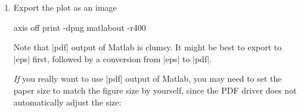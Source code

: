 {{\begin{enumerate}
\begin{codeexample}
h = datacursormode(gcf);
set(h,'UpdateFcn',@myupdatefcn,'SnapToDataVertex','off');
datacursormode on


function [txt] = myupdatefcn(obj,event_obj)

dpi = get(0,'ScreenPixelsPerInch');

screen_location=get(0,'PointerLocation');

figurePos = get(gcf,'Position');

pos = get(event_obj,'Position');

display(['(',num2str(pos(1)),',',num2str(pos(2)),',',num2str(pos(3)),') => (', ...
   num2str((screen_location(1)-figurePos(1))*72.27/dpi),',', ...
   num2str((screen_location(2)-figurePos(2))*72.27/dpi),')'])

txt = {['X: ',num2str(pos(1))],['Y: ',num2str(pos(2))],['Z: ',num2str(pos(3))]};
\end{codeexample}
	
	Run |pgfplotscsconversion|, click on four points in your plot. Preferably select non-colinear points near the edges of the plot. Copy and paste the four lines that were written to the Matlab command window.

	Make sure that the first two points have different $X$ and $Y$ values on screen (i.e.\ image canvas coordinates).
	\item Export the plot as an image
\begin{codeexample}
axis off
print -dpng matlabout -r400 %
\end{codeexample}

Note that |pdf| output of Matlab is clumsy. It might be best to export to |eps| first, followed by a conversion from |eps| to |pdf|.

\emph{If} you really want to use |pdf| output of Matlab, you may need to set the paper size to match the figure size by yourself, since the PDF driver does not automatically adjust the size:


\end{enumerate}}}
